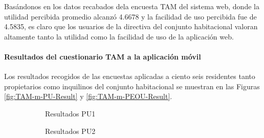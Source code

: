 Basándonos en los datos recabados dela encuesta TAM del sistema web, donde la utilidad percibida promedio alcanzó 4.6678 y la facilidad de uso percibida fue de 4.5835, es claro que los usuarios de la directiva del conjunto habitacional valoran altamente tanto la utilidad como la facilidad de uso de la aplicación web.


\paragraph{Resultados del cuestionario TAM a la aplicación móvil} Los resultados recogidos de las encuestas aplicadas a ciento seis residentes tanto propietarios como inquilinos del conjunto habitacional se muestran en las Figuras \ref{fig:TAM-m-PU-Result} y \ref{fig:TAM-m-PEOU-Result}.

\begin{figure}[H]
    \centering
    \begin{subfigure}[b]{0.4\textwidth}
        \caption{Resultados PU1}
    \end{subfigure}%
    \hfill
    \begin{subfigure}[b]{0.4\textwidth}
        \caption{Resultados PU2}
    \end{subfigure}%
    \\
    \begin{subfigure}[b]{0.4\textwidth}

\end{subfigure}
\end{figure}
